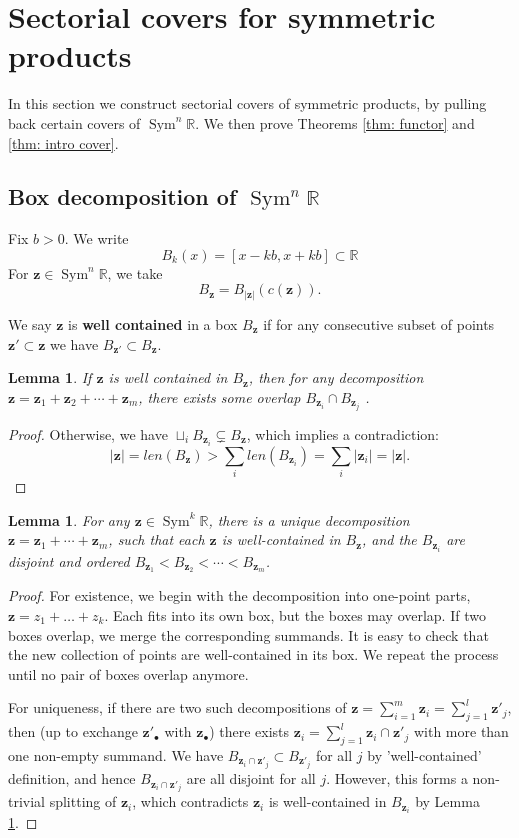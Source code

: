 \documentclass{article}
\def\R{\mathbb{R}}
\def\C{\mathbb{C}}
\def\In{\subset}
\DeclareMathOperator{\Sym}{Sym}
\def\bz{\mathbf{z}} %
\newtheorem{lemma}[theorem]{Lemma}
\theoremstyle{definition}
\begin{document}
\section{Sectorial covers for symmetric products} 

In this section we construct sectorial covers of symmetric products, by pulling back certain covers of $\Sym^n \R$.  We then prove Theorems \ref{thm: functor} and \ref{thm: intro cover}. 


\subsection{Box decomposition of $\Sym^n \R$}

Fix $b > 0$.  We write 
$$ B_k(x) = [x - k b, x+kb] \subset \R$$ 
For $\mathbf{z} \in \Sym^n \R$, we take 
$$ B_{\mathbf{z}} = B_{|\mathbf{z}|}(c(\mathbf{z})). $$ 


We say $\bz$ is {\bf well contained} in a box $B_\bz$ if for any consecutive subset of points $\bz' \In \bz$ we have $B_{\bz'} \In B_{\bz}$.

\begin{lemma}\label{lm:no-splitting}
    If $\bz$ is well contained in $B_\bz$, then for any decomposition $\bz = \bz_1 + \bz_2 + \cdots + \bz_m$, there exists some overlap $B_{\bz_i} \cap B_{\bz_{j}}$ . 
\end{lemma}
\begin{proof}
    Otherwise,  we have $\sqcup_i B_{\bz_i} \subsetneq B_{\bz}$, which implies a contradiction:
    $$ |\bz|=len(B_{\bz}) > \sum_i len(B_{\bz_i}) = \sum_i |\bz_i| = |\bz|.$$
\end{proof}

\begin{lemma}\label{lm:cluster-in-box}
For any $\mathbf{z} \in \Sym^k \R$, there is a unique decomposition $\mathbf{z} = \mathbf{z}_1 + \cdots + \mathbf{z}_m$, such that each $\bz$ is well-contained in $B_{\bz}$, and the $B_{\mathbf{z}_i}$ are disjoint and ordered $B_{\mathbf{z}_1} < B_{\mathbf{z}_2} < \cdots < B_{\mathbf{z}_m}$. 
\end{lemma}
\begin{proof}
For existence, we begin with the decomposition into one-point parts, $\mathbf{z} = z_1 + \ldots + z_k$.  Each fits into its own  box, but the boxes may overlap. If two boxes overlap, we merge the corresponding summands. It is easy to check that the new collection of points are well-contained in its box. We repeat the process until no pair of boxes overlap anymore.  

For uniqueness, if there are two such decompositions of $\bz = \sum_{i=1}^m \bz_i = \sum_{j=1}^l \bz'_j$, then (up to exchange $\bz'_\bullet$ with $\bz_\bullet$) there exists $\bz_i = \sum_{j=1}^l \bz_i \cap \bz'_j$ with more than one non-empty summand. We have $B_{\bz_i \cap \bz'_j} \In B_{\bz'_j}$ for all $j$ by 'well-contained' definition, and hence $B_{\bz_i \cap \bz'_j}$ are all disjoint for all $j$. However, this forms a non-trivial splitting of $\bz_i$, which contradicts $\bz_i$ is well-contained in $B_{\bz_i}$ by Lemma \ref{lm:no-splitting}. 
\end{proof}
\end{document}

